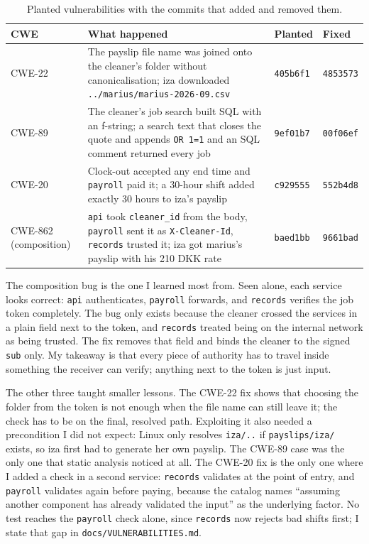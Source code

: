 \documentclass[11pt,a4paper]{article}
\newcommand{\file}[1]{\nolinkurl{#1}}
\newcommand{\commit}[1]{\texttt{#1}}
\begin{document}
\begin{table}[h]
\centering\small
\begin{tabularx}{\textwidth}{@{}lYll@{}}
\toprule
CWE & What happened & Planted & Fixed \\
\midrule
CWE-22 & The payslip file name was joined onto the cleaner's folder without canonicalisation; iza downloaded \texttt{../marius/marius-2026-09.csv} & \commit{405b6f1} & \commit{4853573} \\
CWE-89 & The cleaner's job search built SQL with an f-string; a search text that closes the quote and appends \texttt{OR 1=1} and an SQL comment returned every job & \commit{9ef01b7} & \commit{00f06ef} \\
CWE-20 & Clock-out accepted any end time and \texttt{payroll} paid it; a 30-hour shift added exactly 30 hours to iza's payslip & \commit{c929555} & \commit{552b4d8} \\
CWE-862 (composition) & \texttt{api} took \texttt{cleaner\_id} from the body, \texttt{payroll} sent it as \texttt{X-Cleaner-Id}, \texttt{records} trusted it; iza got marius's payslip with his 210 DKK rate & \commit{baed1bb} & \commit{9661bad} \\
\bottomrule
\end{tabularx}
\caption{Planted vulnerabilities with the commits that added and removed them.}
\end{table}

The composition bug is the one I learned most from. Seen alone, each service looks correct: \texttt{api} authenticates, \texttt{payroll} forwards, and \texttt{records} verifies the job token completely. The bug only exists because the cleaner crossed the services in a plain field next to the token, and \texttt{records} treated being on the internal network as being trusted. The fix removes that field and binds the cleaner to the signed \texttt{sub} only. My takeaway is that every piece of authority has to travel inside something the receiver can verify; anything next to the token is just input.

The other three taught smaller lessons. The CWE-22 fix shows that choosing the folder from the token is not enough when the file name can still leave it; the check has to be on the final, resolved path. Exploiting it also needed a precondition I did not expect: Linux only resolves \texttt{iza/..} if \file{payslips/iza/} exists, so iza first had to generate her own payslip. The CWE-89 case was the only one that static analysis noticed at all. The CWE-20 fix is the only one where I added a check in a second service: \texttt{records} validates at the point of entry, and \texttt{payroll} validates again before paying, because the catalog names ``assuming another component has already validated the input'' as the underlying factor. No test reaches the \texttt{payroll} check alone, since \texttt{records} now rejects bad shifts first; I state that gap in \file{docs/VULNERABILITIES.md}.
\end{document}

